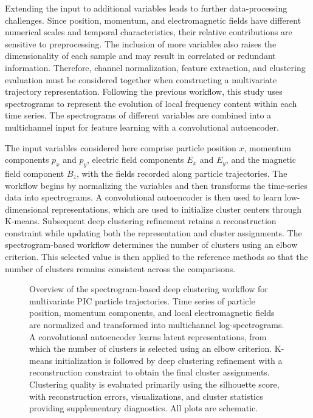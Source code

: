 Extending the input to additional variables leads to further data-processing challenges. Since position, momentum, and electromagnetic fields have different numerical scales and temporal characteristics, their relative contributions are sensitive to preprocessing. The inclusion of more variables also raises the dimensionality of each sample and may result in correlated or redundant information. Therefore, channel normalization, feature extraction, and clustering evaluation must be considered together when constructing a multivariate trajectory representation. Following the previous workflow, this study uses spectrograms to represent the evolution of local frequency content within each time series. The spectrograms of different variables are combined into a multichannel input for feature learning with a convolutional autoencoder.

The input variables considered here comprise particle position \(x\), momentum components \(p_x\) and \(p_y\), electric field components \(E_x\) and \(E_y\), and the magnetic field component \(B_z\), with the fields recorded along particle trajectories. The workflow begins by normalizing the variables and then transforms the time-series data into spectrograms. A convolutional autoencoder is then used to learn low-dimensional representations, which are used to initialize cluster centers through K-means. Subsequent deep clustering refinement retains a reconstruction constraint while updating both the representation and cluster assignments. The spectrogram-based workflow determines the number of clusters using an elbow criterion. This selected value is then applied to the reference methods so that the number of clusters remains consistent across the comparisons.

\begin{figure}[htbp]
\centering
{}
\caption[Overview of the multivariate PIC deep clustering workflow]{Overview of the spectrogram-based deep clustering workflow for multivariate PIC particle trajectories. Time series of particle position, momentum components, and local electromagnetic fields are normalized and transformed into multichannel log-spectrograms. A convolutional autoencoder learns latent representations, from which the number of clusters is selected using an elbow criterion. K-means initialization is followed by deep clustering refinement with a reconstruction constraint to obtain the final cluster assignments. Clustering quality is evaluated primarily using the silhouette score, with reconstruction errors, visualizations, and cluster statistics providing supplementary diagnostics. All plots are schematic.}\label{fig:workflow}
\end{figure}

